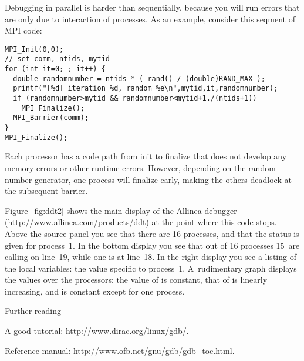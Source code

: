 Debugging in parallel is harder than sequentially, because you will run
errors that are only due to interaction of processes. 
As an example, consider this seqment of MPI code:
\begin{verbatim}
MPI_Init(0,0);
// set comm, ntids, mytid
for (int it=0; ; it++) {
  double randomnumber = ntids * ( rand() / (double)RAND_MAX );
  printf("[%d] iteration %d, random %e\n",mytid,it,randomnumber);
  if (randomnumber>mytid && randomnumber<mytid+1./(ntids+1))  
    MPI_Finalize();
  MPI_Barrier(comm);
}
MPI_Finalize();
\end{verbatim}
Each processor has a code path from init to finalize that does not develop
any memory errors or other runtime errors. However, depending on the random
number generator, one process will finalize early, making the others deadlock
at the subsequent barrier.

Figure~\ref{fig:ddt2} shows the main display of the Allinea 
debugger (\url{http://www.allinea.com/products/ddt}) at the point where this code stops.
Above the source panel you see that there are 16 processes, and that the status is given
for process~1.
In the bottom display you see that out of 16 processes 15~are calling  on line~19,
while one is at line~18. In the right display you see a listing of the local variables:
the value specific to process~1. A~rudimentary graph displays the values over the processors:
the value of  is constant, that of  is linearly increasing, and 
is constant except for one process.


 {Further reading}

A good tutorial: \url{http://www.dirac.org/linux/gdb/}.

Reference manual: \url{http://www.ofb.net/gnu/gdb/gdb_toc.html}.

